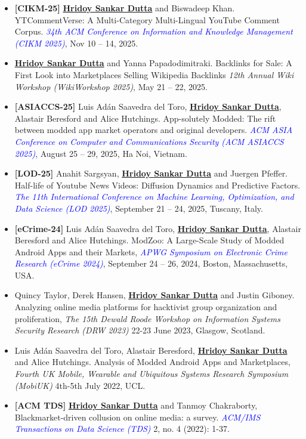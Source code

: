 \documentclass[margin, centered,lmodern]{res}
\begin{document}
\begin{resume}
\begin{itemize}[leftmargin=*]
\item  \textbf{[CIKM-25]} \textbf{\underline{Hridoy Sankar Dutta}} and Biswadeep Khan. YTCommentVerse: A Multi-Category Multi-Lingual YouTube Comment Corpus. \textit{\textcolor{blue}{34th ACM Conference on Information and Knowledge Management (CIKM 2025)}}, Nov 10 – 14, 2025.

\item \textbf{\underline{Hridoy Sankar Dutta}} and Yanna Papadodimitraki. Backlinks for Sale: A First Look into Marketplaces Selling Wikipedia Backlinks \textit{12th Annual Wiki Workshop (WikiWorkshop 2025)}, May 21 – 22, 2025.
\item \textbf{[ASIACCS-25]}  Luis Adán Saavedra del Toro,  \textbf{\underline{Hridoy Sankar Dutta}}, Alastair Beresford and Alice Hutchings. App-solutely Modded: The rift between modded app market operators and original developers.   \textit{\textcolor{blue}{ACM ASIA Conference on Computer and Communications Security (ACM ASIACCS 2025)}}, August 25 – 29, 2025, Ha Noi, Vietnam.
\item  \textbf{[LOD-25]} Anahit Sargsyan, \textbf{\underline{Hridoy Sankar Dutta}} and Juergen Pfeffer.  Half-life of Youtube News Videos: Diffusion Dynamics and Predictive Factors.   \textit{\textcolor{blue}{The 11th International Conference on Machine Learning, Optimization, and Data Science (LOD 2025)}}, September 21 – 24, 2025, Tuscany, Italy.
\item  \textbf{[eCrime-24]}  Luis Adán Saavedra del Toro,  \textbf{\underline{Hridoy Sankar Dutta}}, Alastair Beresford and Alice Hutchings.  ModZoo: A Large-Scale Study of Modded Android Apps and their Markets,  \textit{\textcolor{blue}{APWG Symposium on Electronic Crime Research (eCrime 2024)}}, September 24 – 26, 2024, Boston, Massachusetts, USA.
\item Quincy Taylor,  Derek Hansen,  \textbf{\underline{Hridoy Sankar Dutta}} and Justin Giboney. Analyzing online media platforms for hacktivist group organization and proliferation,  \textit{The 15th Dewald Roode Workshop on Information Systems Security Research (DRW 2023)} 22-23 June 2023, Glasgow, Scotland.

\item Luis Adán Saavedra del Toro,  Alastair Beresford,  \textbf{\underline{Hridoy Sankar Dutta}} and Alice Hutchings. Analysis of Modded Android Apps and Marketplaces,  \textit{Fourth UK Mobile, Wearable and Ubiquitous Systems Research Symposium (MobiUK)} 4th-5th July 2022, UCL.

\item  \textbf{[ACM TDS]} \textbf{\underline{Hridoy Sankar Dutta}} and Tanmoy Chakraborty, Blackmarket-driven collusion on online media: a survey.  \textit{\textcolor{blue}{ACM/IMS Transactions on Data Science (TDS)}} 2, no. 4 (2022): 1-37.


\end{itemize}
\end{resume}
\end{document}

